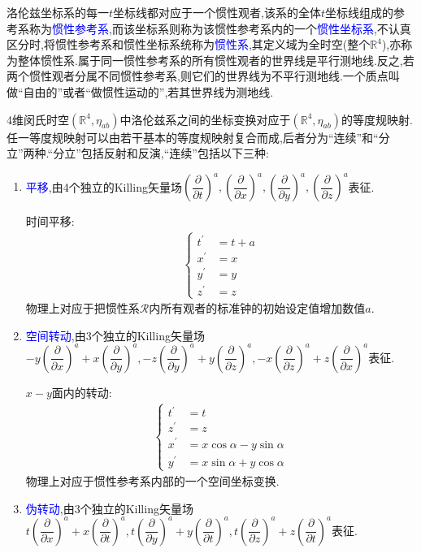 洛伦兹坐标系的每一$t$坐标线都对应于一个惯性观者,该系的全体$t$坐标线组成的参考系称为\textcolor{blue}{惯性参考系},而该坐标系则称为该惯性参考系内的一个\textcolor{blue}{惯性坐标系},不认真区分时,将惯性参考系和惯性坐标系统称为\textcolor{blue}{惯性系},其定义域为全时空(整个$\mathbb{R}^4$),亦称为整体惯性系.属于同一惯性参考系的所有惯性观者的世界线是平行测地线.反之,若两个惯性观者分属不同惯性参考系,则它们的世界线为不平行测地线.一个质点叫做“自由的”或者“做惯性运动的”,若其世界线为测地线.

4维闵氏时空$(\mathbb{R}^4,\eta_{ab})$中洛伦兹系之间的坐标变换对应于$(\mathbb{R}^4,\eta_{ab})$的等度规映射.任一等度规映射可以由若干基本的等度规映射复合而成,后者分为“连续”和“分立”两种.“分立”包括反射和反演,“连续”包括以下三种:
\begin{enumerate}
    \item \textcolor{blue}{平移},由4个独立的Killing矢量场$\left(\dfrac{\partial }{\partial t}\right)^a,\left(\dfrac{\partial }{\partial x}\right)^a,\left(\dfrac{\partial }{\partial y}\right)^a,\left(\dfrac{\partial }{\partial z}\right)^a$表征.
    
    时间平移:
    \begin{align}
    \left\{
    \begin{aligned}
    t^\prime&=t+a\\
    x^\prime&=x\\
    y^\prime&=y\\
    z^\prime&=z
    \end{aligned}
    \right.
    \end{align}
    物理上对应于把惯性系$\mathscr{R}$内所有观者的标准钟的初始设定值增加数值$a$.
    \item \textcolor{blue}{空间转动},由3个独立的Killing矢量场$-y\left(\dfrac{\partial }{\partial x}\right)^a+x\left(\dfrac{\partial }{\partial y}\right)^a,-z\left(\dfrac{\partial }{\partial y}\right)^a+y\left(\dfrac{\partial }{\partial z}\right)^a,-x\left(\dfrac{\partial }{\partial z}\right)^a+z\left(\dfrac{\partial }{\partial x}\right)^a$表征.
    
    $x-y$面内的转动:
    \begin{align}
    \left\{
    \begin{aligned}
    t^\prime &=t\\
    z^\prime &=z\\
    x^\prime&=x\cos\alpha-y\sin\alpha\\
    y^\prime&=x\sin\alpha+y\cos\alpha
    \end{aligned}
    \right.
\end{align}
物理上对应于惯性参考系内部的一个空间坐标变换.
\item \textcolor{blue}{伪转动},由3个独立的Killing矢量场$t\left(\dfrac{\partial }{\partial x}\right)^a+x\left(\dfrac{\partial }{\partial t}\right)^a,t\left(\dfrac{\partial }{\partial y}\right)^a+y\left(\dfrac{\partial }{\partial t}\right)^a,t\left(\dfrac{\partial }{\partial z}\right)^a+z\left(\dfrac{\partial }{\partial t}\right)^a$表征.


\end{enumerate}
